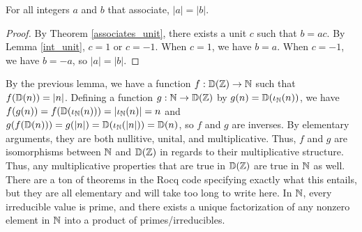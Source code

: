 \documentclass[../../math.tex]{subfiles}
\begin{document}
\begin{lemma} \label{int_div_to_nat_wd}
    For all integers $a$ and $b$ that associate, $|a| = |b|$.
\end{lemma}
\begin{proof}
    By Theorem \ref{associates_unit}, there exists a unit $c$ such that $b =
    ac$.  By Lemma \ref{int_unit}, $c = 1$ or $c = -1$.  When $c = 1$, we have
    $b = a$.  When $c = -1$, we have $b = -a$, so $|a| = |b|$.
\end{proof}

By the previous lemma, we have a function $f : \mathbb{D}(\mathbb{Z}) \to \mathbb{N}$ such that
$f(\mathbb{D}(n)) = |n|$.  Defining a function $g : \mathbb{N} \to \mathbb{D}(\mathbb{Z})$ by $g(n) =
\mathbb{D}(\iota_{\mathbb{N}}(n))$, we have $f(g(n)) = f(\mathbb{D}(\iota_{\mathbb{N}}(n))) = |\iota_{\mathbb{N}}(n)| = n$ and $g(f(\mathbb{D}(n))) =
g(|n|) = \mathbb{D}(\iota_{\mathbb{N}}(|n|)) = \mathbb{D}(n)$, so $f$ and $g$ are inverses.  By elementary
arguments, they are both nullitive, unital, and multiplicative.  Thus, $f$ and
$g$ are isomorphisms between $\mathbb{N}$ and $\mathbb{D}(\mathbb{Z})$ in regards to their
multiplicative structure.  Thus, any multiplicative properties that are true in
$\mathbb{D}(\mathbb{Z})$ are true in $\mathbb{N}$ as well.  There are a ton of theorems in the Rocq code
specifying exactly what this entails, but they are all elementary and will take
too long to write here.  In $\mathbb{N}$, every irreducible value is prime, and there
exists a unique factorization of any nonzero element in $\mathbb{N}$ into a product of
primes/irreducibles.
\end{document}
